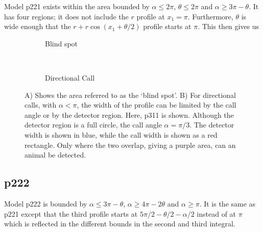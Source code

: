 Model p221 exists within the area bounded by $\alpha\le2\pi$, $\theta\le2\pi$ and $\alpha \ge 3\pi - \theta$. It has four regions; it does not include the $r$ profile at $x_1=\pi$. Furthermore, $\theta$ is wide enough that the $r + r\cos(x_1 + \theta/2)$ profile starts at $\pi$. This then gives us





\begin{figure}[t]
        \centering
        \begin{subfigure}[t]{0.3\textwidth}
                \centering
                \caption{Blind spot}
                \label{f:blindSpot}
        \end{subfigure}
~ 
        \begin{subfigure}[t]{0.3\textwidth}
                \centering
                \caption{Directional Call}
                \label{f:callExplained}
        \end{subfigure}
\caption{A) Shows the area referred to as the `blind spot'. B) For directional calls, with $\alpha<\pi$, the width of the profile can be limited by the call angle or by the detector region. Here, p311 is shown. Although the detector region is a full circle, the call angle $\alpha = \pi/3$. The detector width is shown in blue, while the call width is shown as a red rectangle. Only where the two overlap, giving a purple area, can an animal be detected.  }
\label{f:p22}
\end{figure}




\subsection{p222} \label{p222}

Model p222 is bounded by $\alpha \le 3\pi - \theta$, $\alpha \ge 4\pi - 2\theta$ and $\alpha \ge \pi$. It is the same as p221 except that the third profile starts at $5\pi/2 - \theta/2 - \alpha/2$ instead of at $\pi$ which is reflected in the different bounds in the second and third integral.

